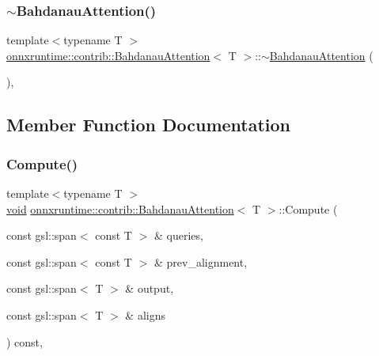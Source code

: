 \subsubsection{\texorpdfstring{$\sim$\+Bahdanau\+Attention()}{~BahdanauAttention()}}
{\footnotesize\ttfamily template$<$typename T $>$ \\
\mbox{\hyperlink{classonnxruntime_1_1contrib_1_1BahdanauAttention}{onnxruntime\+::contrib\+::\+Bahdanau\+Attention}}$<$ T $>$\+::$\sim$\mbox{\hyperlink{classonnxruntime_1_1contrib_1_1BahdanauAttention}{Bahdanau\+Attention}} (\begin{DoxyParamCaption}{ }\end{DoxyParamCaption})\hspace{0.3cm}{\ttfamily [override]}, {\ttfamily [default]}}



\subsection{Member Function Documentation}
\mbox{\label{classonnxruntime_1_1contrib_1_1BahdanauAttention_a6cfed160f597d36d06d3519513ee9295}} 
\subsubsection{\texorpdfstring{Compute()}{Compute()}}
{\footnotesize\ttfamily template$<$typename T $>$ \\
\mbox{\hyperlink{mlasi_8h_a88f941d423cb2a819b70a1358982b1a6}{void}} \mbox{\hyperlink{classonnxruntime_1_1contrib_1_1BahdanauAttention}{onnxruntime\+::contrib\+::\+Bahdanau\+Attention}}$<$ T $>$\+::Compute (\begin{DoxyParamCaption}\item[{const gsl\+::span$<$ const T $>$ \&}]{queries,  }\item[{const gsl\+::span$<$ const T $>$ \&}]{prev\+\_\+alignment,  }\item[{const gsl\+::span$<$ T $>$ \&}]{output,  }\item[{const gsl\+::span$<$ T $>$ \&}]{aligns }\end{DoxyParamCaption}) const\hspace{0.3cm}{\ttfamily [override]}, {\ttfamily [virtual]}}


